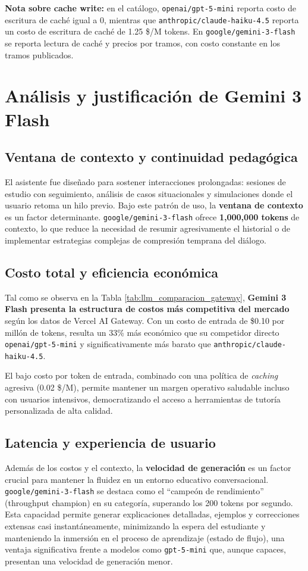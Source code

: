 \textbf{Nota sobre cache write:} en el catálogo, \texttt{openai/gpt-5-mini} reporta costo de escritura de caché igual a 0, mientras que \texttt{anthropic/claude-haiku-4.5} reporta un costo de escritura de caché de 1.25 \$/M tokens. En \texttt{google/gemini-3-flash} se reporta lectura de caché y precios por tramos, con costo constante en los tramos publicados.

\section{Análisis y justificación de Gemini 3 Flash}
\subsection{Ventana de contexto y continuidad pedagógica}
El asistente fue diseñado para sostener interacciones prolongadas: sesiones de estudio con seguimiento, análisis de casos situacionales y simulaciones donde el usuario retoma un hilo previo. Bajo este patrón de uso, la \textbf{ventana de contexto} es un factor determinante. \texttt{google/gemini-3-flash} ofrece \textbf{1{,}000{,}000 tokens} de contexto, lo que reduce la necesidad de resumir agresivamente el historial o de implementar estrategias complejas de compresión temprana del diálogo.

\subsection{Costo total y eficiencia económica}
Tal como se observa en la Tabla \ref{tab:llm_comparacion_gateway}, \textbf{Gemini 3 Flash presenta la estructura de costos más competitiva del mercado} según los datos de Vercel AI Gateway. Con un costo de entrada de \$0.10 por millón de tokens, resulta un 33\% más económico que su competidor directo \texttt{openai/gpt-5-mini} y significativamente más barato que \texttt{anthropic/claude-haiku-4.5}.

El bajo costo por token de entrada, combinado con una política de \textit{caching} agresiva (0.02 \$/M), permite mantener un margen operativo saludable incluso con usuarios intensivos, democratizando el acceso a herramientas de tutoría personalizada de alta calidad.

\subsection{Latencia y experiencia de usuario}
Además de los costos y el contexto, la \textbf{velocidad de generación} es un factor crucial para mantener la fluidez en un entorno educativo conversacional. \texttt{google/gemini-3-flash} se destaca como el \enquote{campeón de rendimiento} (throughput champion) en su categoría, superando los 200 tokens por segundo. Esta capacidad permite generar explicaciones detalladas, ejemplos y correcciones extensas casi instantáneamente, minimizando la espera del estudiante y manteniendo la inmersión en el proceso de aprendizaje (estado de flujo), una ventaja significativa frente a modelos como \texttt{gpt-5-mini} que, aunque capaces, presentan una velocidad de generación menor.

